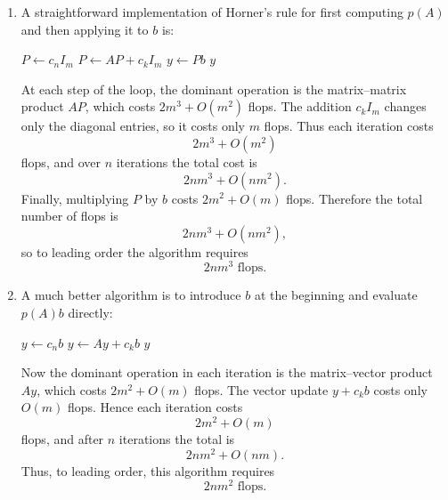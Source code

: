 \documentclass{ctexart}
\begin{document}
\begin{solution}
  \begin{enumerate}[label=(\alph*)]
    \item A straightforward implementation of Horner's rule for first computing
      \(p(A)\) and then applying it to \(b\) is:

      \begin{algorithm}
        \caption{Horner method for computing \(p(A)\) and then \(p(A)b\)}
        \begin{algorithmic}
          \State \(P \gets c_n I_m\)
          \State \(P \gets AP + c_k I_m\)
          \EndFor
          \State \(y \gets Pb\)
          \State \Return \(y\)
        \end{algorithmic}
      \end{algorithm}

      At each step of the loop, the dominant operation is the matrix--matrix
      product \(AP\), which costs \(2m^3 + O(m^2)\) flops. The addition
      \(c_k I_m\) changes only the diagonal entries, so it costs only \(m\) flops.
      Thus each iteration costs
      \[
        2m^3 + O(m^2)
      \]
      flops, and over \(n\) iterations the total cost is
      \[
        2nm^3 + O(nm^2).
      \]
      Finally, multiplying \(P\) by \(b\) costs \(2m^2 + O(m)\) flops. Therefore
      the total number of flops is
      \[
        2nm^3 + O(nm^2),
      \]
      so to leading order the algorithm requires
      \[
        \boxed{2nm^3 \text{ flops}.}
      \]

    \item A much better algorithm is to introduce \(b\) at the beginning and
      evaluate \(p(A)b\) directly:

      \begin{algorithm}
        \caption{Horner method for directly computing \(p(A)b\)}
        \begin{algorithmic}
          \State \(y \gets c_n b\)
          \State \(y \gets Ay + c_k b\)
          \EndFor
          \State \Return \(y\)
        \end{algorithmic}
      \end{algorithm}

      Now the dominant operation in each iteration is the matrix--vector product
      \(Ay\), which costs \(2m^2 + O(m)\) flops. The vector update \(y + c_k b\)
      costs only \(O(m)\) flops. Hence each iteration costs
      \[
        2m^2 + O(m)
      \]
      flops, and after \(n\) iterations the total is
      \[
        2nm^2 + O(nm).
      \]
      Thus, to leading order, this algorithm requires
      \[
        \boxed{2nm^2 \text{ flops}.}
      \]


\end{enumerate}
\end{solution}
\end{document}

